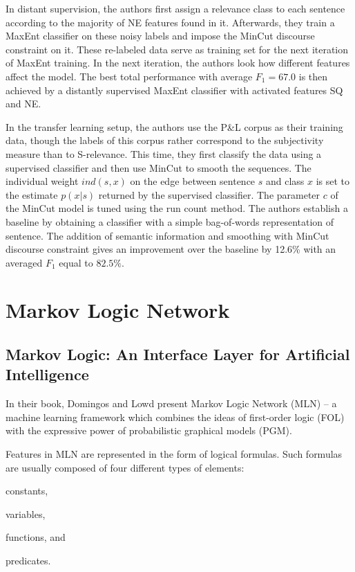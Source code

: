 \documentclass[a4paper,11pt]{article}
\begin{document}
In distant supervision, the authors first assign a relevance class to
each sentence according to the majority of NE features found in it.
Afterwards, they train a MaxEnt classifier on these noisy labels and
impose the MinCut discourse constraint on it.  These re-labeled data
serve as training set for the next iteration of MaxEnt training.  In
the next iteration, the authors look how different features affect the
model.  The best total performance with average $F_1 = 67.0$ is then
achieved by a distantly supervised MaxEnt classifier with activated
features SQ and NE.

In the transfer learning setup, the authors use the P\&L corpus as
their training data, though the labels of this corpus rather
correspond to the subjectivity measure than to S-relevance.  This
time, they first classify the data using a supervised classifier and
then use MinCut to smooth the sequences.  The individual weight
$ind(s,x)$ on the edge between sentence $s$ and class $x$ is set to
the estimate $p(x|s)$ returned by the supervised classifier.  The
parameter $c$ of the MinCut model is tuned using the run count method.
The authors establish a baseline by obtaining a classifier with a
simple bag-of-words representation of sentence.  The addition of
semantic information and smoothing with MinCut discourse constraint
gives an improvement over the baseline by 12.6\% with an averaged
$F_1$ equal to $82.5\%$.

\section{Markov Logic Network}

\subsection{Markov Logic: An Interface Layer for Artificial Intelligence \cite{Domingos-09}}

In their book, Domingos and Lowd present Markov Logic Network (MLN) -- a
machine learning framework which combines the ideas of first-order logic (FOL)
with the expressive power of probabilistic graphical models (PGM).

Features in MLN are represented in the form of logical formulas.  Such
formulas are usually composed of four different types of elements:
\begin{inparaenum}
\item constants,
\item variables,
\item functions, and
\item predicates.
\end{inparaenum}
\end{document}
